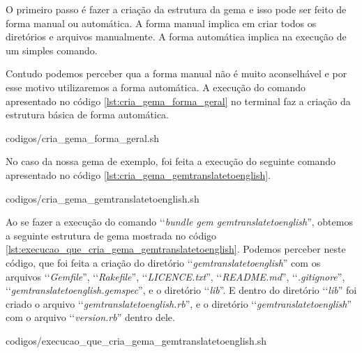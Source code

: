 O primeiro passo é fazer a criação da estrutura da gema e isso pode ser feito de forma manual ou automática.
A forma manual implica em criar todos os diretórios e arquivos manualmente. A forma automática implica na
execução de um simples comando.

Contudo podemos perceber qua a forma manual não é muito aconselhável e por esse motivo utilizaremos a
forma automática. A execução do comando apresentado no código \ref{lst:cria_gema_forma_geral} no terminal
faz a criação da estrutura básica de forma automática.


{codigos/cria_gema_forma_geral.sh}

No caso da nossa gema de exemplo, foi feita a execução do seguinte comando apresentado no código
\ref{lst:cria_gema_gemtranslatetoenglish}.


{codigos/cria_gema_gemtranslatetoenglish.sh}

Ao se fazer a execução do comando ‘‘\emph{bundle gem gemtranslatetoenglish}'', obtemos a seguinte estrutura de gema mostrada
no código \ref{lst:execucao_que_cria_gema_gemtranslatetoenglish}. Podemos perceber neste código, que foi feita a criação do
diretório ‘‘\emph{gemtranslatetoenglish}'' com os arquivos ‘‘\emph{Gemfile}'', ‘‘\emph{Rakefile}'', ‘‘\emph{LICENCE.txt}'',
‘‘\emph{README.md}'', ‘‘\emph{.gitignore}'', ‘‘\emph{gemtranslatetoenglish.gemspec}'', e o diretório ‘‘\emph{lib}''. E dentro do
diretório ‘‘\emph{lib}'' foi criado o arquivo ‘‘\emph{gemtranslatetoenglish.rb}'', e o diretório
‘‘\emph{gemtranslatetoenglish}'' com o arquivo ‘‘\emph{version.rb}'' dentro dele.



{codigos/execucao_que_cria_gema_gemtranslatetoenglish.sh}

